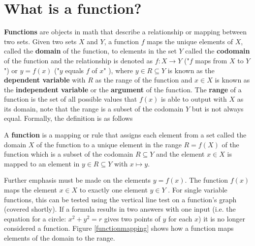 \section{What is a function?}
\textbf{Functions} are objects in math that describe a relationship or mapping between two sets. Given two sets $X$ and $Y$, a function $f$ maps the unique elements of $X$, called the \textbf{domain} of the function, to elements in the set $Y$ called the \textbf{codomain} of the function and the relationship is denoted as $f : X \to Y$ ("$f$ maps from $X$ to $Y$") or $y = f(x)$ ("$y$ equals $f$ of $x$" \cite{understandinganalysis}), where $y \in R \subseteq Y$ is known as the \textbf{dependent variable} with $R$ as the range of the function and $x \in X$ is known as the \textbf{independent variable} or the \textbf{argument} of the function. The \textbf{range} of a function is the set of all possible values that $f(x)$ is able to output with $X$ as its domain, note that the range is a subset of the codomain $Y$ but is not always equal. Formally, the definition is as follows

\begin{definition}
    A \textbf{function} is a mapping or rule that assigns each element from a set called the domain $X$ of the function to a unique element in the range $R = f(X)$ of the function which is a subset of the codomain $R \subseteq Y$ and the element $x \in X$ is mapped to an element in $y \in R \subseteq Y$ with $x \mapsto y$.
\end{definition}

Further emphasis must be made on the elements $y = f(x)$. The function $f(x)$ maps the element $x \in X$ to exactly one element $y \in Y$ \cite{elemrealandcomplex}. For single variable functions, this can be tested using the vertical line test on a function's graph (covered shortly). If a formula results in two answers with one input (i.e. the equation for a circle: $x^2 + y^2 = r$ gives two points of $y$ for each $x$) it is no longer considered a function. Figure \ref{functionmapping} shows how a function maps elements of the domain to the range.

